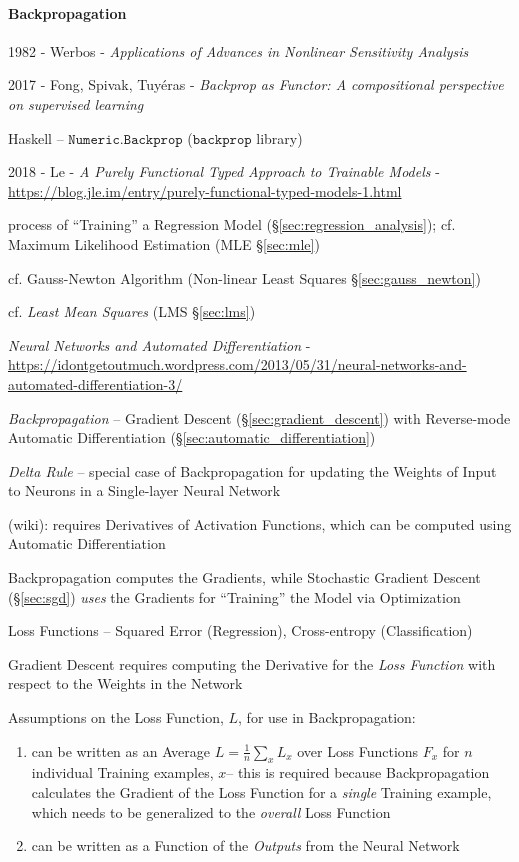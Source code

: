 \paragraph{Backpropagation}\label{sec:backpropagation}\hfill

1982 - Werbos -
\emph{Applications of Advances in Nonlinear Sensitivity Analysis}

2017 - Fong, Spivak, Tuy\'eras - \emph{Backprop as Functor: A compositional
  perspective on supervised learning}

Haskell -- $\mathtt{Numeric.Backprop}$ ($\mathtt{backprop}$ library)

2018 - Le - \emph{A Purely Functional Typed Approach to Trainable Models} -
\url{https://blog.jle.im/entry/purely-functional-typed-models-1.html}

process of ``Training'' a Regression Model (\S\ref{sec:regression_analysis});
cf. Maximum Likelihood Estimation (MLE \S\ref{sec:mle})

cf. Gauss-Newton Algorithm (Non-linear Least Squares \S\ref{sec:gauss_newton})

cf. \emph{Least Mean Squares} (LMS \S\ref{sec:lms})

\emph{Neural Networks and Automated Differentiation} -
\url{https://idontgetoutmuch.wordpress.com/2013/05/31/neural-networks-and-automated-differentiation-3/}

\emph{Backpropagation} -- Gradient Descent (\S\ref{sec:gradient_descent}) with
Reverse-mode Automatic Differentiation (\S\ref{sec:automatic_differentiation})

\emph{Delta Rule} -- special case of Backpropagation for updating the Weights of
Input to Neurons in a Single-layer Neural Network

(wiki): requires Derivatives of Activation Functions, which can be computed
using Automatic Differentiation

Backpropagation computes the Gradients, while Stochastic Gradient Descent
(\S\ref{sec:sgd}) \emph{uses} the Gradients for ``Training'' the Model via
Optimization

Loss Functions -- Squared Error (Regression), Cross-entropy (Classification)

Gradient Descent requires computing the Derivative for the \emph{Loss Function}
with respect to the Weights in the Network

Assumptions on the Loss Function, $L$, for use in Backpropagation:
\begin{enumerate}
  \item can be written as an Average $L = \frac{1}{n} \sum_x L_x$ over Loss
    Functions $F_x$ for $n$ individual Training examples, $x$-- this is required
    because Backpropagation calculates the Gradient of the Loss Function for a
    \emph{single} Training example, which needs to be generalized to the
    \emph{overall} Loss Function
  \item can be written as a Function of the \emph{Outputs} from the Neural
    Network
\end{enumerate}

